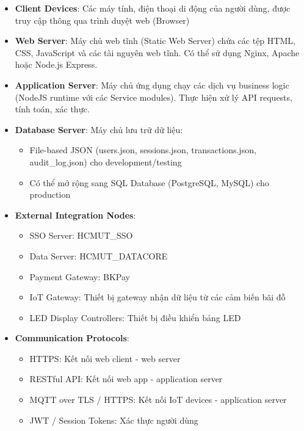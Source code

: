 \begin{itemize}
    \item \textbf{Client Devices}: Các máy tính, điện thoại di động của người dùng, được truy cập thông qua trình duyệt web (Browser)
    
    \item \textbf{Web Server}: Máy chủ web tĩnh (Static Web Server) chứa các tệp HTML, CSS, JavaScript và các tài nguyên web tĩnh. Có thể sử dụng Nginx, Apache hoặc Node.js Express.
    
    \item \textbf{Application Server}: Máy chủ ứng dụng chạy các dịch vụ business logic (NodeJS runtime với các Service modules). Thực hiện xử lý API requests, tính toán, xác thực.
    
    \item \textbf{Database Server}: Máy chủ lưu trữ dữ liệu:
    \begin{itemize}
        \item File-based JSON (users.json, sessions.json, transactions.json, audit\_log.json) cho development/testing
        \item Có thể mở rộng sang SQL Database (PostgreSQL, MySQL) cho production
    \end{itemize}
    
    \item \textbf{External Integration Nodes}:
    \begin{itemize}
        \item SSO Server: HCMUT\_SSO
        \item Data Server: HCMUT\_DATACORE
        \item Payment Gateway: BKPay
        \item IoT Gateway: Thiết bị gateway nhận dữ liệu từ các cảm biến bãi đỗ
        \item LED Display Controllers: Thiết bị điều khiển bảng LED
    \end{itemize}
    
    \item \textbf{Communication Protocols}:
    \begin{itemize}
        \item HTTPS: Kết nối web client - web server
        \item RESTful API: Kết nối web app - application server
        \item MQTT over TLS / HTTPS: Kết nối IoT devices - application server
        \item JWT / Session Tokens: Xác thực người dùng
    \end{itemize}
\end{itemize}


